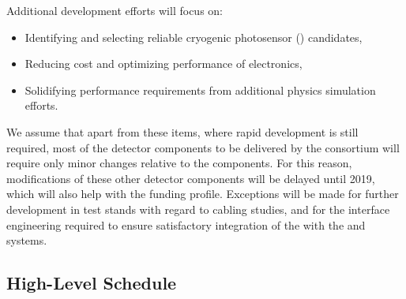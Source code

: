 
Additional development efforts will focus on:

\begin{itemize}
\item Identifying and selecting reliable cryogenic photosensor () candidates,
\item Reducing cost and optimizing performance of  electronics,
\item Solidifying  performance requirements from additional physics simulation efforts.
\end{itemize}

We assume that apart from these items, where rapid development is still required, most of the detector components to be delivered by the  consortium will require only minor changes relative to the  components. For this reason, modifications of these other detector components will be delayed until 2019, which will also help with the funding profile. Exceptions will be made for further development in test stands with regard to cabling studies, and for the interface engineering required to ensure satisfactory integration of the  with the  and   systems.


\subsection{High-Level Schedule}
\label{sec:fdsp-pd-org-cs}


